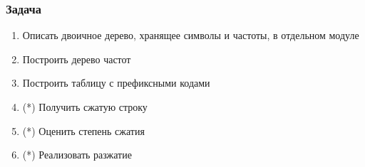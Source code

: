 \documentclass{../../slides-style}
\begin{document}
    \begin{frame}
        \frametitle{Задача}
        \begin{enumerate}
            \item Описать двоичное дерево, хранящее символы и частоты, в отдельном модуле
            \item Построить дерево частот
            \item Построить таблицу с префиксными кодами
            \item (*) Получить сжатую строку
            \item (*) Оценить степень сжатия
            \item (*) Реализовать разжатие
        \end{enumerate}
    \end{frame}
\end{document}
